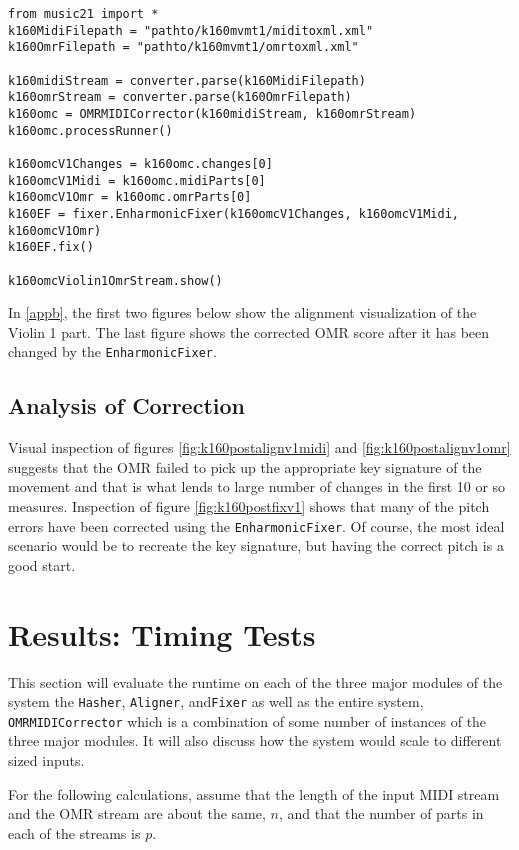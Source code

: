 \begin{verbatim}
from music21 import *
k160MidiFilepath = "pathto/k160mvmt1/miditoxml.xml"
k160OmrFilepath = "pathto/k160mvmt1/omrtoxml.xml"
         
k160midiStream = converter.parse(k160MidiFilepath)
k160omrStream = converter.parse(k160OmrFilepath)
k160omc = OMRMIDICorrector(k160midiStream, k160omrStream)
k160omc.processRunner()
        
k160omcV1Changes = k160omc.changes[0]
k160omcV1Midi = k160omc.midiParts[0]
k160omcV1Omr = k160omc.omrParts[0]
k160EF = fixer.EnharmonicFixer(k160omcV1Changes, k160omcV1Midi, k160omcV1Omr)
k160EF.fix()

k160omcViolin1OmrStream.show()
\end{verbatim}

In \ref{appb}, the first two figures below show the alignment visualization of the Violin 1 part. The last figure shows the corrected OMR score after it has been changed by the \texttt{EnharmonicFixer}.

\subsection{Analysis of Correction}
Visual inspection of figures \ref{fig:k160postalignv1midi} and \ref{fig:k160postalignv1omr} suggests that the OMR failed to pick up the appropriate key signature of the movement and that is what lends to large number of changes in the first 10 or so measures. Inspection of figure \ref{fig:k160postfixv1} shows that many of the pitch errors have been corrected using the \texttt{EnharmonicFixer}. Of course, the most ideal scenario would be to recreate the key signature, but having the correct pitch is a good start. 

\section{Results: Timing Tests} \label{timing}
This section will evaluate the runtime on each of the three major modules of the system the \texttt{Hasher}, \texttt{Aligner}, and\texttt{Fixer} as well as the entire system, \texttt{OMRMIDICorrector} which is a combination of some number of instances of the three major modules. It will also discuss how the system would scale to different sized inputs. 

For the following calculations, assume that the length of the input MIDI stream and the OMR stream are about the same, $n$, and that the number of parts in each of the streams is $p$. 

